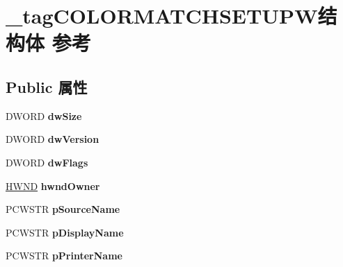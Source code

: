 \hypertarget{struct__tag_c_o_l_o_r_m_a_t_c_h_s_e_t_u_p_w}{}\section{\+\_\+tag\+C\+O\+L\+O\+R\+M\+A\+T\+C\+H\+S\+E\+T\+U\+P\+W结构体 参考}
\label{struct__tag_c_o_l_o_r_m_a_t_c_h_s_e_t_u_p_w}
\subsection*{Public 属性}
\begin{DoxyCompactItemize}
\item 
\mbox{\label{struct__tag_c_o_l_o_r_m_a_t_c_h_s_e_t_u_p_w_af5e4cd9cd60724bc37ec70937ada9b61}} 
D\+W\+O\+RD {\bfseries dw\+Size}
\item 
\mbox{\label{struct__tag_c_o_l_o_r_m_a_t_c_h_s_e_t_u_p_w_a616df54303175f422db8da817bc88680}} 
D\+W\+O\+RD {\bfseries dw\+Version}
\item 
\mbox{\label{struct__tag_c_o_l_o_r_m_a_t_c_h_s_e_t_u_p_w_afb9ed546a19bd6e73624e51cb2addefc}} 
D\+W\+O\+RD {\bfseries dw\+Flags}
\item 
\mbox{\label{struct__tag_c_o_l_o_r_m_a_t_c_h_s_e_t_u_p_w_a3533dd02e10b8abc2f8b6ef2529e102e}} 
\hyperlink{interfacevoid}{H\+W\+ND} {\bfseries hwnd\+Owner}
\item 
\mbox{\label{struct__tag_c_o_l_o_r_m_a_t_c_h_s_e_t_u_p_w_a8db47472013f65d388e1a6cc157bc31d}} 
P\+C\+W\+S\+TR {\bfseries p\+Source\+Name}
\item 
\mbox{\label{struct__tag_c_o_l_o_r_m_a_t_c_h_s_e_t_u_p_w_a5ae382f2a79cf2c8c8f8461afae6bb5d}} 
P\+C\+W\+S\+TR {\bfseries p\+Display\+Name}
\item 
\mbox{\label{struct__tag_c_o_l_o_r_m_a_t_c_h_s_e_t_u_p_w_ab158f551eef6d263435f85ac91bec8c3}} 
P\+C\+W\+S\+TR {\bfseries p\+Printer\+Name}

\end{DoxyCompactItemize}
